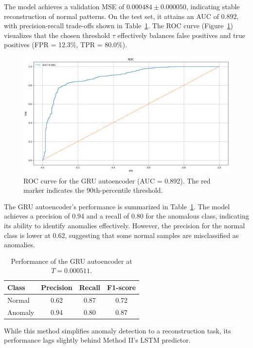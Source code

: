 \documentclass[ngerman]{scrartcl}
\begin{document}
\noindent The model achieves a validation MSE of \(0.000484 \pm 0.000050\), indicating stable reconstruction of normal patterns. On the test set, it attains an AUC of \(0.892\), with precision-recall trade-offs shown in Table~\ref{tab:gru_results}. The ROC curve (Figure~\ref{fig:rocGRU}) visualizes that the chosen threshold \(\tau\) effectively balances false positives and true positives (FPR = 12.3\%, TPR = 80.0\%).
\begin{figure}[h]
    \centering
    \includegraphics[width=\textwidth]{./Figures/ROC_Autoenc.png}
    \caption{ROC curve for the GRU autoencoder (AUC = 0.892). The red marker indicates the 90th-percentile threshold.}
    \label{fig:rocGRU}
\end{figure}
\noindent The GRU autoencoder's performance is summarized in Table~\ref{tab:gru_results}. The model achieves a precision of 0.94 and a recall of 0.80 for the anomalous class, indicating its ability to identify anomalies effectively. However, the precision for the normal class is lower at 0.62, suggesting that some normal samples are misclassified as anomalies.
\begin{table}[H]
    \centering
    \begin{tabular}{lccc}
        \toprule
        Class & Precision & Recall & F1-score \\
        \midrule
        Normal & 0.62 & 0.87 & 0.72 \\
        Anomaly & 0.94 & 0.80 & 0.87 \\
        \bottomrule
    \end{tabular}
    \caption{Performance of the GRU autoencoder at \(T = 0.000511\).}
    \label{tab:gru_results}
\end{table}
\noindent While this method simplifies anomaly detection to a reconstruction task, its performance lags slightly behind Method II's LSTM predictor.%
\end{document}
